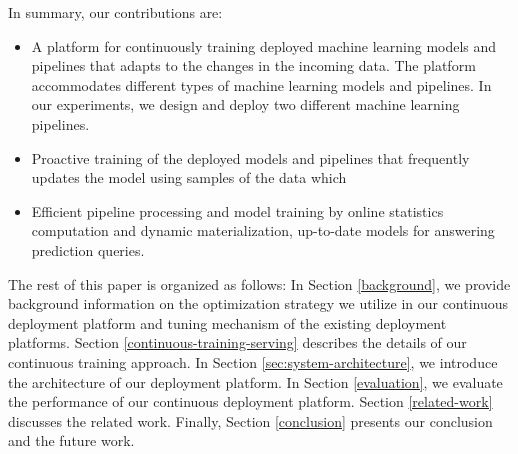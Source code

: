 In summary, our contributions are:
\begin{itemize}
\item A platform for continuously training deployed machine learning models and pipelines that adapts to the changes in the incoming data. The platform accommodates different types of machine learning models and pipelines. In our experiments, we design and deploy two different machine learning pipelines.
\item Proactive training of the deployed models and pipelines that frequently updates the model using samples of the data which  
\item Efficient pipeline processing and model training by online statistics computation and dynamic materialization,   up-to-date models for answering prediction queries.
\end{itemize}

The rest of this paper is organized as follows:
In Section \ref{background}, we provide background information on the optimization strategy we utilize in our continuous deployment platform and tuning mechanism of the existing deployment platforms.
Section \ref{continuous-training-serving} describes the details of our continuous training approach.
In Section \ref{sec:system-architecture}, we introduce the architecture of our deployment platform.
In Section \ref{evaluation}, we evaluate the performance of our continuous deployment platform.
Section \ref {related-work} discusses the related work.
Finally, Section \ref{conclusion} presents our conclusion and the future work.